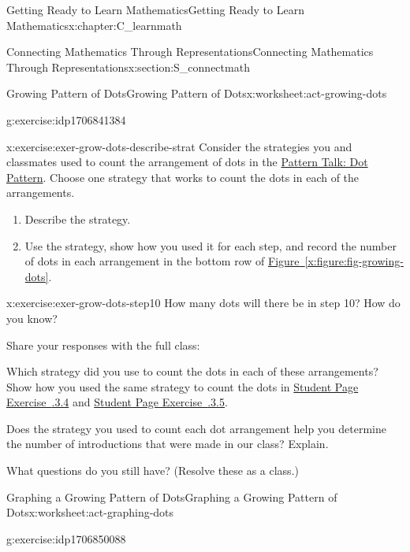 \documentclass[oneside,10pt,]{book}
\newcommand{\xreffont}{\relax}
\numberwithin{equation}{chapter}
\begin{document}
\begin{chapterptx}{Getting Ready to Learn Mathematics}{}{Getting Ready to Learn Mathematics}{}{}{x:chapter:C_learnmath}
\begin{sectionptx}{Connecting Mathematics Through Representations}{}{Connecting Mathematics Through Representations}{}{}{x:section:S_connectmath}
\begin{worksheet-subsection}{Growing Pattern of Dots}{}{Growing Pattern of Dots}{}{}{x:worksheet:act-growing-dots}
\begin{divisionexercise}{3}{}{}{g:exercise:idp1706841384}
\begin{enumerate}[font=\bfseries,label=(\alph*),ref=\alph*]
\end{enumerate}
\end{divisionexercise}%
\begin{divisionexercise}{4}{}{}{x:exercise:exer-grow-dots-describe-strat}%
Consider the strategies you and classmates used to count the arrangement of dots in the \hyperref[x:subsection:SS_dot_pattern]{Pattern Talk: Dot Pattern}. Choose one strategy that works to count the dots in each of the arrangements.%
\begin{enumerate}[font=\bfseries,label=(\alph*),ref=\alph*]
\item{}Describe the strategy.%
\item{}Use the strategy, show how you used it for each step, and record the number of dots in each arrangement in the bottom row of \hyperref[x:figure:fig-growing-dots]{Figure~{\xreffont\ref{x:figure:fig-growing-dots}}}.%
\end{enumerate}
\end{divisionexercise}%
\begin{divisionexercise}{5}{}{}{x:exercise:exer-grow-dots-step10}%
How many dots will there be in step 10? How do you know?%
\end{divisionexercise}%
\begin{conclusion}{}%
Share your responses with the full class:%
\par
Which strategy did you use to count the dots in each of these arrangements? Show how you used the same strategy to count the dots in \hyperlink{x:exercise:exer-grow-dots-describe-strat}{Student Page Exercise~{\xreffont 1.3.3.4}} and \hyperlink{x:exercise:exer-grow-dots-step10}{Student Page Exercise~{\xreffont 1.3.3.5}}.%
\par
Does the strategy you used to count each dot arrangement help you determine the number of introductions that were made in our class? Explain.%
\par
What questions do you still have? (Resolve these as a class.)%
\end{conclusion}%
\end{worksheet-subsection}
\restoregeometry
%
%
\typeout{************************************************}
\typeout{************************************************}
%
\begin{worksheet-subsection}{Graphing a Growing Pattern of Dots}{}{Graphing a Growing Pattern of Dots}{}{}{x:worksheet:act-graphing-dots}
\begin{divisionexercise}{1}{}{}{g:exercise:idp1706850088}%

\end{divisionexercise}
\end{worksheet-subsection}
\end{sectionptx}
\end{chapterptx}
\end{document}
